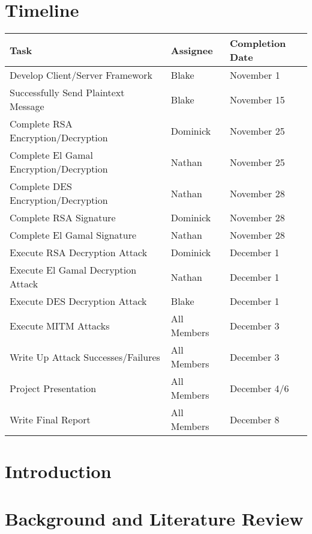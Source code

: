 \documentclass{report}
\begin{document}
\section{Timeline}
\begin{tabular}{l|l|l}
    Task & Assignee & Completion Date \\ \hline
    Develop Client/Server Framework & Blake & November 1\\
    Successfully Send Plaintext Message & Blake & November 15\\
    Complete RSA Encryption/Decryption & Dominick & November 25\\
    Complete El Gamal Encryption/Decryption & Nathan & November 25\\
    Complete DES Encryption/Decryption & Nathan & November 28\\
    Complete RSA Signature & Dominick & November 28\\
    Complete El Gamal Signature & Nathan & November 28\\
    Execute RSA Decryption Attack & Dominick & December 1\\
    Execute El Gamal Decryption Attack & Nathan & December 1\\
    Execute DES Decryption Attack & Blake & December 1\\
    Execute MITM Attacks & All Members & December 3\\
    Write Up Attack Successes/Failures & All Members & December 3\\
    Project Presentation & All Members & December 4/6\\ 
    Write Final Report & All Members & December 8
\end{tabular}

\section{Introduction}

\section{Background and Literature Review}

\iffalse 
\newpage

\begin{thebibliography}{9}

    \bibitem{ieee}
    IEEE-CS/ACM Joint Task Force on Software Engineering Ethics and Professional Practices\\
    \texttt{https://www.computer.org/web/education/code-of-ethics}

\end{thebibliography}
\fi
\end{document}

